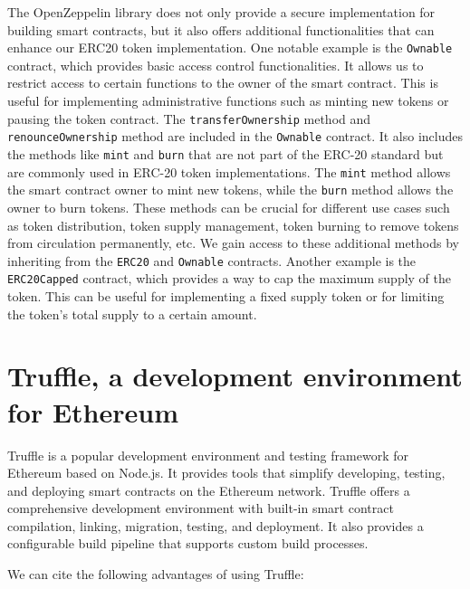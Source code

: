 The OpenZeppelin library does not only provide a secure implementation for building smart contracts,  but it also offers additional functionalities that can enhance our ERC20 token
implementation. One notable example is the \texttt{Ownable} contract, which provides basic access control functionalities. It allows us to restrict access to certain functions
to the owner of the smart contract. This is useful for implementing administrative functions such as minting new tokens or pausing the token contract. The \texttt{transferOwnership} method and \texttt{renounceOwnership}
method are included in the \texttt{Ownable} contract. It also includes the methods like \texttt{mint} and \texttt{burn} that are not part of the ERC-20 standard but are commonly used in ERC-20 token implementations. The \texttt{mint} method allows
the smart contract owner to mint new tokens, while the \texttt{burn} method allows the owner to burn tokens. These methods can be crucial for different use cases
such as token distribution, token supply management, token burning to remove tokens from circulation permanently, etc. We gain access to these additional methods
by inheriting from the \texttt{ERC20} and \texttt{Ownable} contracts. Another example is the \texttt{ERC20Capped} contract, which provides a way to cap the maximum supply of the token. This can be useful for
implementing a fixed supply token or for limiting the token's total supply to a certain amount.


\section{Truffle, a development environment for Ethereum}
\label{sec:ch2_truffle}


Truffle \cite{truffle} is a popular development environment and testing framework for Ethereum based on Node.js. It provides tools that simplify
developing, testing, and deploying smart contracts on the Ethereum network. Truffle offers a comprehensive development environment with
built-in smart contract compilation, linking, migration, testing, and deployment. It also provides a configurable build pipeline that supports custom build processes.

We can cite the following advantages of using Truffle:


